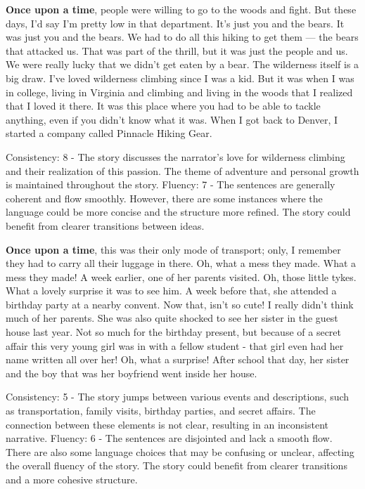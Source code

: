 \documentclass{article}
\begin{document}
\textbf{Once upon a time}, people were willing to go to the woods and fight. But these days, I'd say I'm pretty low in that department. It's just you and the bears. It was just you and the bears. We had to do all this hiking to get them — the bears that attacked us. That was part of the thrill, but it was just the people and us. We were really lucky that we didn't get eaten by a bear. The wilderness itself is a big draw. I've loved wilderness climbing since I was a kid. But it was when I was in college, living in Virginia and climbing and living in the woods that I realized that I loved it there. It was this place where you had to be able to tackle anything, even if you didn't know what it was. When I got back to Denver, I started a company called Pinnacle Hiking Gear.

Consistency: 8 - The story discusses the narrator's love for wilderness climbing and their realization of this passion. The theme of adventure and personal growth is maintained throughout the story.
Fluency: 7 - The sentences are generally coherent and flow smoothly. However, there are some instances where the language could be more concise and the structure more refined. The story could benefit from clearer transitions between ideas.

\textbf{Once upon a time}, this was their only mode of transport; only, I remember they had to carry all their luggage in there. Oh, what a mess they made.  What a mess they made!  A week earlier, one of her parents visited. Oh, those little tykes. What a lovely surprise it was to see him.  A week before that, she attended a birthday party at a nearby convent. Now that, isn't so cute! I really didn't think much of her parents.  She was also quite shocked to see her sister in the guest house last year. Not so much for the birthday present, but because of a secret affair this very young girl was in with a fellow student - that girl even had her name written all over her!  Oh, what a surprise!  After school that day, her sister and the boy that was her boyfriend went inside her house.

Consistency: 5 - The story jumps between various events and descriptions, such as transportation, family visits, birthday parties, and secret affairs. The connection between these elements is not clear, resulting in an inconsistent narrative.
Fluency: 6 - The sentences are disjointed and lack a smooth flow. There are also some language choices that may be confusing or unclear, affecting the overall fluency of the story. The story could benefit from clearer transitions and a more cohesive structure.
\end{document}
